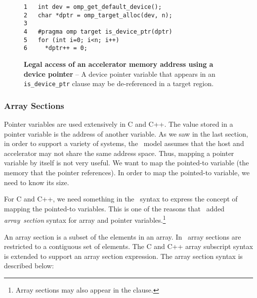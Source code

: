\begin{figure*}[!tb]
\begin{verbatim}
1   int dev = omp_get_default_device();
2   char *dptr = omp_target_alloc(dev, n);
3 
4   #pragma omp target is_device_ptr(dptr)
5   for (int i=0; i<n; i++)
6     *dptr++ = 0;
\end{verbatim}
\caption{ \textbf {Legal access of an accelerator memory address using a device pointer} -- \small
          A device pointer variable that appears in an \texttt{is\_device\_ptr} clause 
          may be de-referenced in a target region.
        }
\label{figure:chapter6-devptr3}
\end{figure*}


\subsubsection{Array Sections}
\label{ssec:06.array-sections}

Pointer variables are used extensively in C and C++.  The value stored in a
pointer variable is the address of another variable.  As we saw in the last
section, in order to support a variety of systems, the \OMP\ model assumes that
the host and accelerator may not share the same address space. Thus, mapping a
pointer variable by itself is not very useful.  We want to map the pointed-to
variable (the memory that the pointer references). In order to map the
pointed-to variable, we need to know its size.

For C and C++, we need something in the \OMP\ syntax to express the concept of
mapping the pointed-to variables.  This is one of the reasons that \OMPfourzero\
added \emph{array}~\emph{section} syntax for array and pointer 
variables.\footnote{Array sections may also appear in the  clause.}

An array section is a subset of the elements in an array.  In \OMP\, array
sections are restricted to a contiguous set of elements.  The C and C++ array
subscript syntax is extended to support an array section expression.  The
array section syntax \code{base[\emph{offset}:\emph{length}]} is described below:

